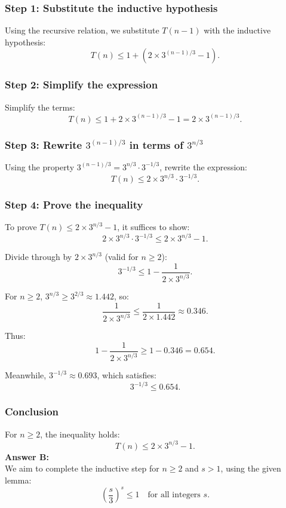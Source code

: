\documentclass[12pt]{article}
\begin{document}
\subsubsection*{Step 1: Substitute the inductive hypothesis}
Using the recursive relation, we substitute \( T(n-1) \) with the inductive hypothesis:
\[
T(n) \leq 1 + \left( 2 \times 3^{(n-1)/3} - 1 \right).
\]

\subsubsection*{Step 2: Simplify the expression}
Simplify the terms:
\[
T(n) \leq 1 + 2 \times 3^{(n-1)/3} - 1 = 2 \times 3^{(n-1)/3}.
\]

\subsubsection*{Step 3: Rewrite \( 3^{(n-1)/3} \) in terms of \( 3^{n/3} \)}
Using the property \( 3^{(n-1)/3} = 3^{n/3} \cdot 3^{-1/3} \), rewrite the expression:
\[
T(n) \leq 2 \times 3^{n/3} \cdot 3^{-1/3}.
\]

\subsubsection*{Step 4: Prove the inequality}
To prove \( T(n) \leq 2 \times 3^{n/3} - 1 \), it suffices to show:
\[
2 \times 3^{n/3} \cdot 3^{-1/3} \leq 2 \times 3^{n/3} - 1.
\]

Divide through by \( 2 \times 3^{n/3} \) (valid for \( n \geq 2 \)):
\[
3^{-1/3} \leq 1 - \frac{1}{2 \times 3^{n/3}}.
\]

For \( n \geq 2 \), \( 3^{n/3} \geq 3^{2/3} \approx 1.442 \), so:
\[
\frac{1}{2 \times 3^{n/3}} \leq \frac{1}{2 \times 1.442} \approx 0.346.
\]

Thus:
\[
1 - \frac{1}{2 \times 3^{n/3}} \geq 1 - 0.346 = 0.654.
\]

Meanwhile, \( 3^{-1/3} \approx 0.693 \), which satisfies:
\[
3^{-1/3} \leq 0.654.
\]

\subsubsection*{Conclusion}
For \( n \geq 2 \), the inequality holds:
\[
T(n) \leq 2 \times 3^{n/3} - 1.
\]
\textbf{Answer B: }\\
We aim to complete the inductive step for \( n \geq 2 \) and \( s > 1 \), using the given lemma:
\[
\left( \frac{s}{3} \right)^s \leq 1 \quad \text{for all integers } s.
\]
\end{document}
